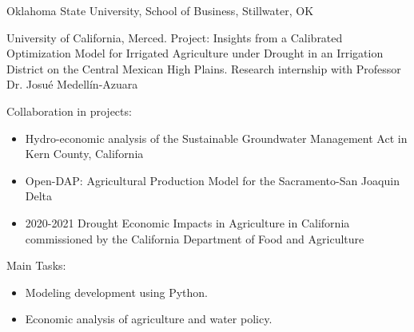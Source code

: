 \documentclass[a4paper,12pt]{memoir} %
\begin{document}


 {Oklahoma State University, School of Business, Stillwater, OK}


\vspace{0.2 cm}

 {University of California, Merced.}
Project: Insights from a Calibrated Optimization Model for Irrigated Agriculture under Drought in an Irrigation District on the Central Mexican High Plains. Research internship with Professor Dr. Josué Medellín-Azuara\\


Collaboration in projects:
	\begin{itemize}
		\item Hydro-economic analysis of the Sustainable Groundwater Management Act in Kern County, California
		\item Open-DAP: Agricultural Production Model for the Sacramento-San Joaquin Delta
		\item 2020-2021 Drought Economic Impacts in Agriculture in California commissioned by the California Department of Food and Agriculture
	\end{itemize}

Main Tasks: 

\begin{itemize}
	\item Modeling development using Python.
	\item Economic analysis of agriculture and water policy.
\end{itemize}




\Sep %

\end{document}
